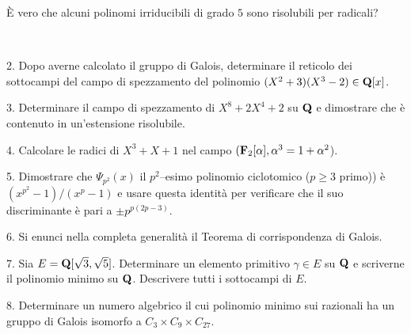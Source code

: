  \`E vero che alcuni polinomi irriducibili di grado $5$ sono risolubili per radicali?\medskip\bigskip\bigskip

\ \dotfill\ \bigskip\bigskip\bigskip


\vfil\eject


\item{2.} Dopo averne calcolato il gruppo di Galois, determinare il reticolo dei sottocampi del campo di spezzamento 
del polinomio $(X^2+3)(X^3-2)\in{\bf Q}[x]$.\vv


\item{3.} Determinare il campo di spezzamento di $X^8 + 2X^4 + 2$ su ${\bf Q}$ e dimostrare
che \`e contenuto in un'estensione risolubile.
\ve\ \vs


\item{4.} Calcolare le radici di $X^3+X+1$ nel campo $({\bf F}_2[\alpha], \alpha^3=1+\alpha^2$). \vv

\item{5.} Dimostrare che $\Psi_{p^2}(x)$ il $p^2$--esimo polinomio ciclotomico ($p\ge3$ primo)) \`e $(x^{p^2}-1)/(x^p-1)$ e usare questa identit\`a
per verificare che il suo discriminante \`e pari a $\pm p^{p(2p-3)}.$ \hfil{}
\ve\ \vs


\item{6.} Si enunci nella completa generalit\`a il Teorema di
corrispondenza di Galois.\vskip7cm\vv\vv


\item{7.} Sia $E={\bf Q}[\sqrt{3},\sqrt{5}]$. Determinare un elemento primitivo $\gamma\in E$ su ${\bf Q}$ e scriverne il
polinomio minimo su ${\bf Q}$. Descrivere tutti 
i sottocampi di $E$.\vskip7cm\vv\vv

\item{8.} Determinare un numero algebrico il cui polinomio minimo sui razionali ha un gruppo di 
Galois isomorfo a $C_3\times C_{9} \times C_{27}$.

\vv



\ \vst
 \bye
